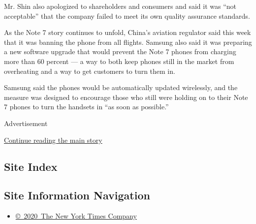 Mr. Shin also apologized to shareholders and consumers and said it was
``not acceptable'' that the company failed to meet its own quality
assurance standards.

As the Note 7 story continues to unfold, China's aviation regulator said
this week that it was banning the phone from all flights. Samsung also
said it was preparing a new software upgrade that would prevent the Note
7 phones from charging more than 60 percent --- a way to both keep
phones still in the market from overheating and a way to get customers
to turn them in.

Samsung said the phones would be automatically updated wirelessly, and
the measure was designed to encourage those who still were holding on to
their Note 7 phones to turn the handsets in ``as soon as possible.''

Advertisement

\protect\hyperlink{after-bottom}{Continue reading the main story}

\hypertarget{site-index}{%
\subsection{Site Index}\label{site-index}}

\hypertarget{site-information-navigation}{%
\subsection{Site Information
Navigation}\label{site-information-navigation}}

\begin{itemize}
\tightlist
\item
  \href{https://help.nytimes.com/hc/en-us/articles/115014792127-Copyright-notice}{©~2020~The
  New York Times Company}
\end{itemize}

